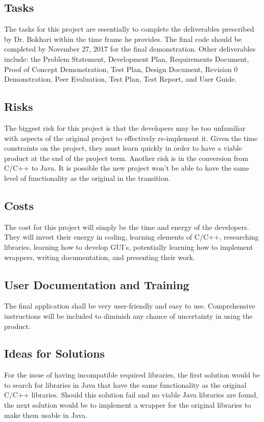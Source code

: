 \documentclass[12pt, titlepage]{article}
\begin{document}
\subsection{Tasks}
\indent \indent The tasks for this project are essentially to complete the deliverables prescribed by Dr. Bokhari within the time frame he provides. The final code should be completed by November 27, 2017 for the final demonstration. Other deliverables include: the Problem Statement, Development Plan, Requirements Document, Proof of Concept Demonstration, Test Plan, Design Document, Revision 0 Demonstration, Peer Evaluation, Test Plan, Test Report, and User Guide.

\subsection{Risks}
\indent \indent The biggest risk for this project is that the developers may be too unfamiliar with aspects of the original project to effectively re-implement it. Given the time constraints on the project, they must learn quickly in order to have a viable product at the end of the project term. Another risk is in the conversion from C/C++ to Java. It is possible the new project won't be able to have the same level of functionality as the original in the transition.

\subsection{Costs}
\indent \indent The cost for this project will simply be the time and energy of the developers. They will invest their energy in coding, learning elements of C/C++, researching libraries, learning how to develop GUI's, potentially learning how to implement wrappers, writing documentation, and presenting their work.

\subsection{User Documentation and Training}
\indent \indent The final application shall be very user-friendly and easy to use. Comprehensive instructions will be included to diminish any chance of uncertainty in using the product.

\subsection{Ideas for Solutions}
\indent \indent For the issue of having incompatible required libraries, the first solution would be to search for libraries in Java that have the same functionality as the original C/C++ libraries. Should this solution fail and no viable Java libraries are found, the next solution would be to implement a wrapper for the original libraries to make them usable in Java.
\end{document}
